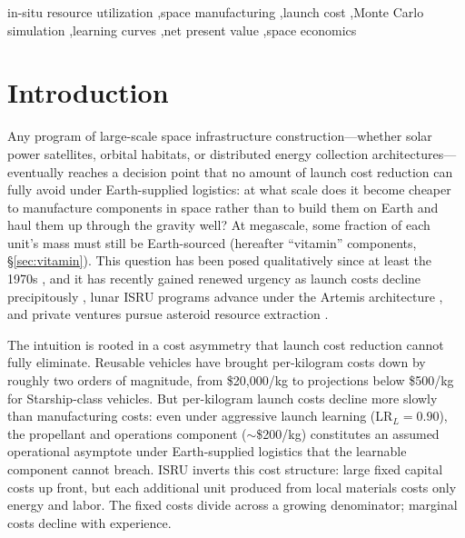 \documentclass[5p,twocolumn]{elsarticle}
\begin{document}
\begin{frontmatter}
\begin{keyword}
in-situ resource utilization \sep space manufacturing \sep launch cost \sep Monte Carlo simulation \sep learning curves \sep net present value \sep space economics
\end{keyword}

\end{frontmatter}

\linenumbers

\section{Introduction}
\label{sec:introduction}

Any program of large-scale space infrastructure construction---whether solar power satellites, orbital habitats, or distributed energy collection architectures---eventually reaches a decision point that no amount of launch cost reduction can fully avoid under Earth-supplied logistics: at what scale does it become cheaper to manufacture components in space rather than to build them on Earth and haul them up through the gravity well? At megascale, some fraction of each unit's mass must still be Earth-sourced (hereafter ``vitamin'' components, \S\ref{sec:vitamin}). This question has been posed qualitatively since at least the 1970s \cite{oneill1974,oneill1976}, and it has recently gained renewed urgency as launch costs decline precipitously \cite{jones2018}, lunar ISRU programs advance under the Artemis architecture \cite{sanders2015}, and private ventures pursue asteroid resource extraction \cite{elvis2012,andrews2015}.

The intuition is rooted in a cost asymmetry that launch cost reduction cannot fully eliminate. Reusable vehicles have brought per-kilogram costs down by roughly two orders of magnitude, from \$20{,}000/kg to projections below \$500/kg for Starship-class vehicles. But per-kilogram launch costs decline more slowly than manufacturing costs: even under aggressive launch learning (LR$_L = 0.90$), the propellant and operations component ($\sim$\$200/kg) constitutes an assumed operational asymptote under Earth-supplied logistics that the learnable component cannot breach. ISRU inverts this cost structure: large fixed capital costs up front, but each additional unit produced from local materials costs only energy and labor. The fixed costs divide across a growing denominator; marginal costs decline with experience.
\end{document}
